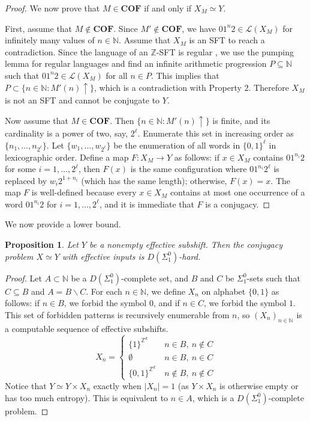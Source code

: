 \documentclass[a4paper]{article}
\newcommand{\Le}{\mathcal{L}}
\newcommand{\Z}{\mathbb{Z}}
\newcommand{\N}{\mathbb{N}}
\newtheorem{proposition}[theorem]{Proposition}
\theoremstyle{definition}
\begin{document}
\begin{proof}
We now prove that $M\in\textbf{COF}$ if and only if $X_M \simeq Y$.

First, assume that $M\not\in \textbf{COF}$. Since $M'\not\in\textbf{COF}$, we have $01^n2\in \Le(X_M)$ for infinitely many values of $n\in\N$. Assume that $X_M$ is an SFT to reach a contradiction. Since the language of an $\Z$-SFT is regular \cite{lind_introduction_1995}, we use the pumping lemma for regular languages and find an infinite arithmetic progression $P\subseteq \N$ such that $01^n2\in\Le(X_M)$ for all $n\in P$. This implies that $P\subset\{n\in\N:M'(n)\uparrow\}$, which is a contradiction with Property 2. Therefore $X_M$ is not an SFT and cannot be conjugate to $Y$.

Now assume that $M\in\textbf{COF}$. Then $\{n\in\N : M'(n)\uparrow\}$ is finite, and its cardinality is a power of two, say, $2^\ell$. Enumerate this set in increasing order as $\{n_1,\dots,n_{2^\ell}\}$. 
Let $\{w_1,\dots,w_{2^\ell}\}$ be the enumeration of all words in $\{0,1\}^\ell$ in lexicographic order. Define a map $F\colon X_M\to Y$ as follows: if $x\in X_M$ contains $01^{n_i}2$ for some $i=1,\dots,2^\ell$, then $F(x)$ is the same configuration where $01^{n_i}2^\ell$ is replaced by $w_i2^{1+n_i}$ (which has the same length); otherwise, $F(x)=x$. The map $F$ is well-defined because every $x\in X_M$ contains at most one occurrence of a word $01^{n_i}2$ for $i=1,\dots,2^\ell$, and it is immediate that $F$ is a conjugacy. 
\end{proof}
We now provide a lower bound. 
\begin{proposition}\label{hardness-conjugacy-with-effective-input}
    Let $Y$ be a nonempty effective subshift. Then the conjugacy problem $X\simeq Y$ with effective inputs is $D(\Sigma_1^0)$-hard. 
\end{proposition}
\begin{proof}
Let $A\subset\N$ be a $D(\Sigma_1^0)$-complete set, and $B$ and $C$ be $\Sigma_1^0$-sets such that $C\subseteq B$ and $A=B\smallsetminus C$. 
For each $n\in\N$, we define $X_n$ on alphabet $\{0,1\}$ as follows: if $n\in B$, we forbid the symbol $0$, and if $n\in C$, we forbid the symbol $1$. This set of forbidden patterns is recursively enumerable from $n$, so $(X_n)_{n\in \N}$ is a computable sequence of effective subshifts.
\[X_n=\begin{cases}
\{1\}^{\Z^d} &\ n\in B, \ n\notin C\\
\emptyset &\ n \in B, \  n\in C \\
\{0,1\}^{\mathbb{Z}^d} &\ n\notin B, \ n\notin C
\end{cases}\]
Notice that $Y\simeq Y\times X_n$ exactly when $|X_n|=1$ (as $Y\times X_n$ is otherwise empty or has too much entropy). This is equivalent to $n\in A$, which is a $D(\Sigma_1^0)$-complete problem. 
\end{proof}
\end{document}
